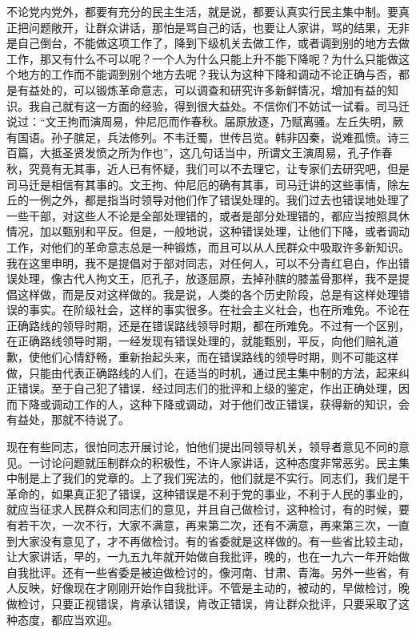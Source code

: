 不论党内党外，都要有充分的民主生活，就是说，都要认真实行民主集中制。要真正把问题敞开，让群众讲话，那怕是骂自己的话，也要让人家讲，骂的结果，无非是自己倒台，不能做这项工作了，降到下级机关去做工作，或者调到别的地方去做工作，那又有什么不可以呢？一个人为什么只能上升不能下降呢？为什么只能做这个地方的工作而不能调到别个地方去呢？我认为这种下降和调动不论正确与否，都是有益处的，可以锻炼革命意志，可以调查和研究许多新鲜情况，增加有益的知识。我自己就有这一方面的经验，得到很大益处。不信你们不妨试一试看。司马迁说过：“文王拘而演周易，仲尼厄而作春秋。届原放逐，乃赋离骚。左丘失明，厥有国语。孙子膑足，兵法修列。不韦迁蜀，世传吕览。韩非囚秦，说难孤愤。诗三百篇，大抵圣贤发愤之所为作也”，这几句话当中，所谓文王演周易，孔子作春秋，究竟有无其事，近人已有怀疑，我们可以不去理它，让专家们去研究吧，但是司马迁是相信有其事的。文王拘、仲尼厄的确有其事，司马迁讲的这些事情，除左丘的一例之外，都是指当时领导对他们作了错误处理的。我们过去也错误地处理了一些干部，对这些人不论是全部处理错的，或者是部分处理错的，都应当按照具休情况，加以甄别和平反。但是，一般地说，这种错误处理，让他们下降，或者调动工作，对他们的革命意志总是一种锻炼，而且可以从人民群众中吸取许多新知识。我在这里申明，我不是提倡对于部对同志，对任何人，可以不分青红皂白，作出错误处理，像古代人拘文王，厄孔子，放逐屈原，去掉孙膑的膝盖骨那样，我不是提倡这样做，而是反对这样做的。我是说，人类的各个历史阶段，总是有这样处理错误的事实。在阶级社会，这样的事实很多。在社会主义社会，也在所难免。不论在正确路线的领导时期，还是在错误路线领导时期，都在所难免。不过有一个区别，在正确路线领导时期，一经发现有错误处理的，就能甄别，平反，向他们赔礼道歉，使他们心情舒畅，重新抬起头来，而在错误路线的领导时期，则不可能这样做，只能由代表正确路线的人们，在适当的时机，通过民主集中制的方法，起来纠正错误。至于自己犯了错误．经过同志们的批评和上级的鉴定，作出正确处理，因而下降或调动工作的人，这种下降或调动，对于他们改正错误，获得新的知识，会有益处，那就不待说了。

现在有些同志，很怕同志开展讨论，怕他们提出同领导机关，领导者意见不同的意见。一讨论问题就压制群众的积极性，不许人家讲话，这种态度非常恶劣。民主集中制是上了我们的党章的。上了我们宪法的，他们就是不实行。同志们，我们是干革命的，如果真正犯了错误，这种错误是不利于党的事业，不利于人民的事业的，就应当征求人民群众和同志们的意见，并且自己做检讨，这种检讨，有的时候，要有若干次，一次不行，大家不满意，再来第二次，还有不满意，再来第三次，一直到大家没有意见了，才不再做检讨。有的省委就是这样做的。有一些省比较主动，让大家讲话，早的，一九五九年就开始做自我批评，晚的，也在一九六一年开始做自我批评。还有一些省委是被迫做检讨的，像河南、甘肃、青海。另外一些省，有人反映，好像现在才刚刚开始作自我批评。不管是主动的，被动的，早做检讨，晚做检讨，只要正视错误，肯承认错误，肯改正错误，肯让群众批评，只要采取了这种态度，都应当欢迎。

